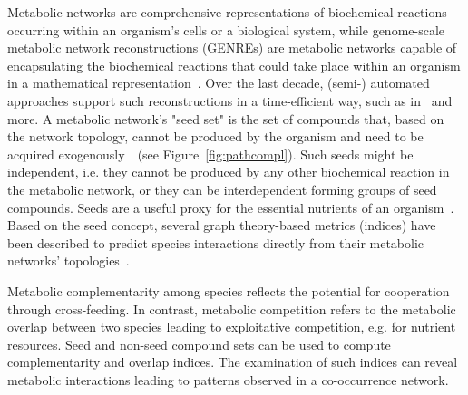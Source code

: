 \documentclass[sn-mathphys,Numbered]{sn-jnl}  %
\theoremstyle{thmstyleone}%
\theoremstyle{thmstyletwo}%
\theoremstyle{thmstylethree}%
\begin{document}
    Metabolic networks are comprehensive representations of biochemical reactions occurring within an organism's cells or a biological system, while genome-scale metabolic network reconstructions (GENREs) are metabolic networks capable of encapsulating the biochemical reactions that could take place within an organism in a mathematical representation~\cite{thiele2010protocol, durot2008genome, communityGemMicrobiomeModel2023}.
    Over the last decade, (semi-) automated approaches support such reconstructions in a time-efficient way, such as in~\cite{machado2018fast, seaver2021modelseed} and more.
    A metabolic network's "seed set" is the set of compounds that, based on the network topology, cannot be produced by the organism and need to be acquired exogenously~\cite{borenstein2008large}~(see Figure~\ref{fig:pathcompl}).
    Such seeds might be independent, i.e. they cannot be produced by any other biochemical reaction in the metabolic network, or they can be interdependent forming groups of seed compounds.
    Seeds are a useful proxy for the essential nutrients of an organism~\cite{parter2007environmental,borenstein2008large}.
    Based on the seed concept, several graph theory-based metrics (indices) have been described to predict species interactions directly from their metabolic networks' topologies~\cite{levy2015netcooperate, kreimer2012netcmpt, zelezniak2015metabolic, belcour2020metage2metabo}.

    Metabolic complementarity among species reflects the potential for cooperation 
    through cross-feeding. 
    In contrast, metabolic competition refers to the metabolic overlap between two species leading to exploitative competition, e.g. for nutrient resources.
    Seed and non-seed compound sets can be used to compute complementarity and overlap indices. 
    The examination of such indices can reveal metabolic interactions leading to patterns observed in a co-occurrence network.
    
\end{document}
